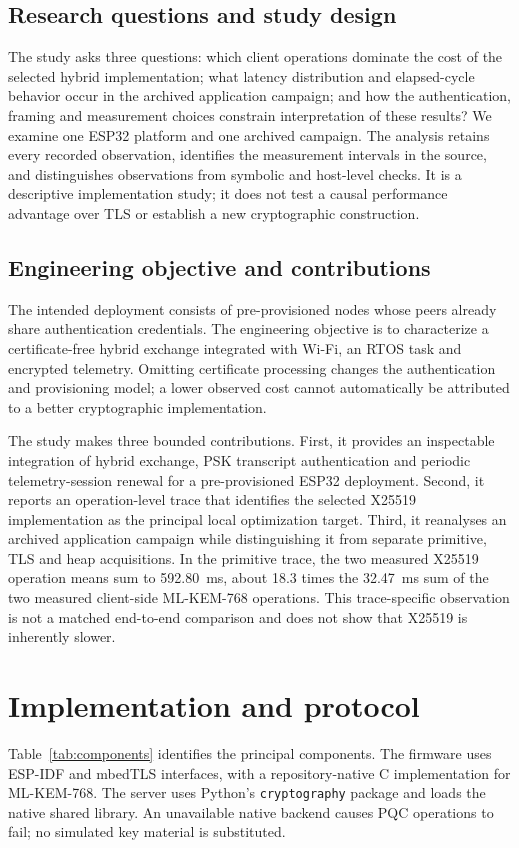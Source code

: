 \documentclass[pdflatex,sn-mathphys-num]{sn-jnl}
\begin{document}
\subsection{Research questions and study design}
The study asks three questions: which client operations dominate the cost of the selected hybrid implementation; what latency distribution and elapsed-cycle behavior occur in the archived application campaign; and how the authentication, framing and measurement choices constrain interpretation of these results? We examine one ESP32 platform and one archived campaign. The analysis retains every recorded observation, identifies the measurement intervals in the source, and distinguishes observations from symbolic and host-level checks. It is a descriptive implementation study; it does not test a causal performance advantage over TLS or establish a new cryptographic construction.

\subsection{Engineering objective and contributions}
The intended deployment consists of pre-provisioned nodes whose peers already share authentication credentials. The engineering objective is to characterize a certificate-free hybrid exchange integrated with Wi-Fi, an RTOS task and encrypted telemetry. Omitting certificate processing changes the authentication and provisioning model; a lower observed cost cannot automatically be attributed to a better cryptographic implementation.

The study makes three bounded contributions. First, it provides an inspectable integration of hybrid exchange, PSK transcript authentication and periodic telemetry-session renewal for a pre-provisioned ESP32 deployment. Second, it reports an operation-level trace that identifies the selected X25519 implementation as the principal local optimization target. Third, it reanalyses an archived application campaign while distinguishing it from separate primitive, TLS and heap acquisitions. In the primitive trace, the two measured X25519 operation means sum to 592.80~ms, about 18.3 times the 32.47~ms sum of the two measured client-side ML-KEM-768 operations. This trace-specific observation is not a matched end-to-end comparison and does not show that X25519 is inherently slower.

\section{Implementation and protocol}
Table~\ref{tab:components} identifies the principal components. The firmware uses ESP-IDF and mbedTLS interfaces, with a repository-native C implementation for ML-KEM-768. The server uses Python's \texttt{cryptography} package and loads the native shared library. An unavailable native backend causes PQC operations to fail; no simulated key material is substituted.
\end{document}
